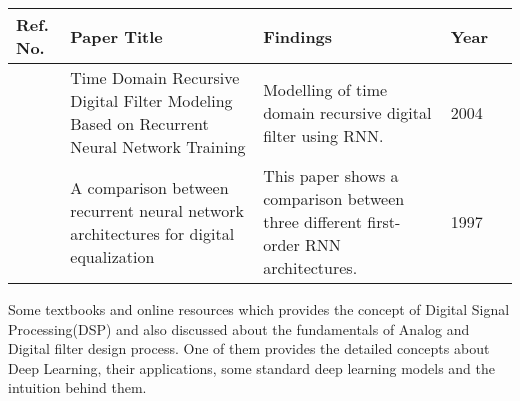 \vspace{1\baselineskip}
\noindent
\begin{tabularx}{\columnwidth}{|M|M|M|M|M|}
	\hline
	\textbf{Ref. No.} & \textbf{Paper Title} & \textbf{Findings} & \textbf{Year}\\
	\hline
	\cite{stefanova2004time} & Time Domain Recursive Digital Filter Modeling Based on Recurrent Neural Network Training & Modelling of time domain recursive digital filter using RNN. & 2004\\
	\hline
	\cite{595494} & A comparison between recurrent neural network architectures for digital equalization & This paper shows a comparison between three different first-order RNN architectures. & 1997\\
	\hline
\end{tabularx}
\vspace{1\baselineskip}

Some textbooks and online resources which provides the concept of Digital Signal Processing(DSP) and also discussed about the fundamentals of Analog and Digital filter design process. One of them provides the detailed concepts about Deep Learning, their applications, some standard deep learning models and the intuition behind them\cite{DigitalSignalProcessing}\cite{AnalogandDigitalFilterDesign}\cite{Goodfellow-et-al-2016}.